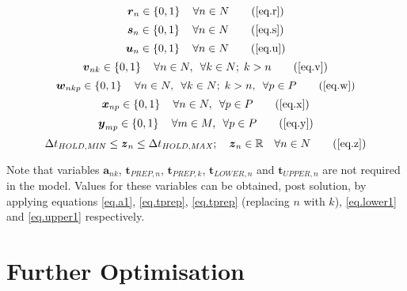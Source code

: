 \begin{equation}
    \boldsymbol{r}_{n} \in \left\{ 0, 1 \right\} \quad \forall n \in N
    \tag{\ref{eq.r}}
\end{equation}
\begin{equation}
    \boldsymbol{s}_{n} \in \left\{ 0, 1 \right\} \quad \forall n \in N
    \tag{\ref{eq.s}}
\end{equation} 
\begin{equation}
    \boldsymbol{u}_{n} \in \left\{ 0, 1 \right\} \quad \forall n \in N
    \tag{\ref{eq.u}}
\end{equation}
\begin{equation}
    \boldsymbol{v}_{nk} \in \left\{ 0, 1 \right\} \quad \forall n \in N,
    \enspace \forall k \in N; \; k > n
    \tag{\ref{eq.v}}
\end{equation}
\begin{equation}
    \boldsymbol{w}_{nkp} \in \left\{ 0, 1 \right\} \quad \forall n \in N, 
    \enspace \forall k \in N; \; k > n, \enspace \forall p \in P
    \tag{\ref{eq.w}}
\end{equation}
\begin{equation}
    \boldsymbol{x}_{np} \in \left\{ 0, 1 \right\} \quad \forall n \in N,
    \enspace \forall p \in P
    \tag{\ref{eq.x}}
\end{equation}
\begin{equation}
    \boldsymbol{y}_{mp} \in \left\{ 0, 1 \right\} \quad \forall m \in M,
    \enspace \forall p \in P
    \tag{\ref{eq.y}}
\end{equation}
\begin{equation}
    \Delta t_{\mathit{HOLD,MIN}} \le \boldsymbol{z}_{n} \le 
    \Delta t_{\mathit{HOLD,MAX}}; \quad
    \boldsymbol{z}_{n} \in \mathbb{R} \quad \forall n \in N
    \tag{\ref{eq.z}}
\end{equation}

Note that variables $\boldsymbol{a}_{nk}$, $\boldsymbol{t}_{\mathit{PREP},n}$,
$\boldsymbol{t}_{\mathit{PREP},k}$, $\boldsymbol{t}_{\mathit{LOWER},n}$ and
$\boldsymbol{t}_{\mathit{UPPER},n}$ are not required in the model. Values for
these variables can be obtained, post solution, by applying equations
\ref{eq.a1}, \ref{eq.tprep}, \ref{eq.tprep} (replacing $n$ with $k$),
\ref{eq.lower1} and \ref{eq.upper1} respectively.

\section{Further Optimisation}\label{S.secondary}

